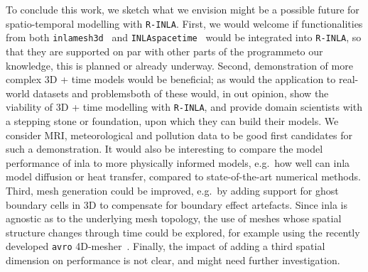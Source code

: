 \documentclass[british]{scrreprt}
\begin{document}
To conclude this work, we sketch what we envision might be a possible future for spatio-temporal modelling with \texttt{R-INLA}. First, we would welcome if functionalities from both \texttt{inlamesh3d}~\cite{Lindgreninlamesh3d2022} and \texttt{INLAspacetime}~\cite{KrainskiINLAspacetime2022} would be integrated into \texttt{R-INLA}, so that they are supported on par with other parts of the programme\textemdash{}to our knowledge, this is planned or already underway. Second, demonstration of more complex 3D + time models would be beneficial; as would the application to real-world datasets and problems\textemdash{}both of these would, in out opinion, show the viability of 3D + time modelling with \texttt{R-INLA}, and provide domain scientists with a stepping stone or foundation, upon which they can build their models. We consider MRI, meteorological and pollution data to be good first candidates for such a demonstration. It would also be interesting to compare the model performance of \gls{inla} to more physically informed models, e.g.\ how well can \gls{inla} model diffusion or heat transfer, compared to state-of-the-art numerical methods. Third, mesh generation could be improved, e.g.\ by adding support for ghost boundary cells in 3D to compensate for boundary effect artefacts. Since \gls{inla} is agnostic as to the underlying mesh topology, the use of meshes whose spatial structure changes through time could be explored, for example using the recently developed \texttt{avro} 4D-mesher~\cite{Caplanavro, CaplanFourdimensionalanisotropicmesh2020}. Finally, the impact of adding a third spatial dimension on performance is not clear, and might need further investigation.

\appendix
\printbibliography[heading = bibnumbered]

\printglossaries
\end{document}

